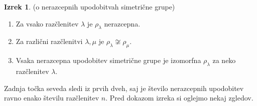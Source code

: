 \documentclass[11pt]{book}
\theoremstyle{definition}
\theoremstyle{zgled}
\theoremstyle{zgledbrezstevilke}
\theoremstyle{odprtproblem}
\theoremstyle{domacanaloga}
\theoremstyle{izrek}
\newtheorem{izrek}[theorem]{Izrek}
\begin{document}
\begin{izrek}(o nerazcepnih upodobitvah simetrične grupe) \leavevmode
\begin{enumerate}
    \item Za vsako razčlenitev $\lambda$ je $\rho_{\lambda}$ nerazcepna.
    \item Za različni razčlenitvi $\lambda, \mu$ je $\rho_{\lambda} \not\cong \rho_{\mu}$.
    \item Vsaka nerazcepna upodobitev simetrične grupe je izomorfna $\rho_{\lambda}$ za neko razčlenitev $\lambda$.
\end{enumerate}
\end{izrek}

Zadnja točka seveda sledi iz prvih dveh, saj je število nerazcepnih upodobitev ravno enako številu razčlenitev $n$. Pred dokazom izreka si oglejmo nekaj zgledov.
\end{document}
